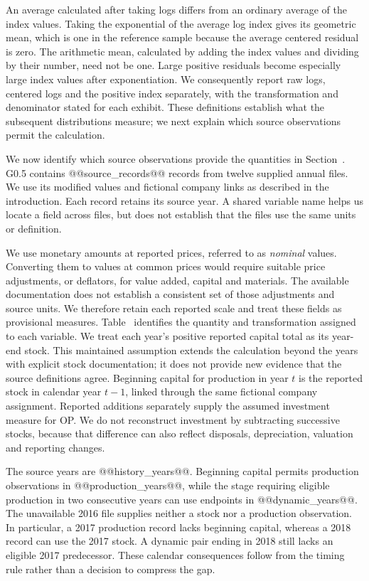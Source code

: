 An average calculated after taking logs differs from an ordinary average of the index values. Taking the exponential of the average log index gives its geometric mean, which is one in the reference sample because the average centered residual is zero. The arithmetic mean, calculated by adding the index values and dividing by their number, need not be one. Large positive residuals become especially large index values after exponentiation. We consequently report raw logs, centered logs and the positive index separately, with the transformation and denominator stated for each exhibit. These definitions establish what the subsequent distributions measure; we next explain which source observations permit the calculation.

We now identify which source observations provide the quantities in Section~. G0.5 contains @@source_records@@ records from twelve supplied annual files. We use its modified values and fictional company links as described in the introduction. Each record retains its source year. A shared variable name helps us locate a field across files, but does not establish that the files use the same units or definition.

We use monetary amounts at reported prices, referred to as \emph{nominal} values. Converting them to values at common prices would require suitable price adjustments, or deflators, for value added, capital and materials. The available documentation does not establish a consistent set of those adjustments and source units. We therefore retain each reported scale and treat these fields as provisional measures. Table~ identifies the quantity and transformation assigned to each variable.
We treat each year's positive reported capital total as its year-end stock. This maintained assumption extends the calculation beyond the years with explicit stock documentation; it does not provide new evidence that the source definitions agree. Beginning capital for production in year $t$ is the reported stock in calendar year $t-1$, linked through the same fictional company assignment. Reported additions separately supply the assumed investment measure for OP. We do not reconstruct investment by subtracting successive stocks, because that difference can also reflect disposals, depreciation, valuation and reporting changes.

The source years are @@history_years@@. Beginning capital permits production observations in @@production_years@@, while the stage requiring eligible production in two consecutive years can use endpoints in @@dynamic_years@@. The unavailable 2016 file supplies neither a stock nor a production observation. In particular, a 2017 production record lacks beginning capital, whereas a 2018 record can use the 2017 stock. A dynamic pair ending in 2018 still lacks an eligible 2017 predecessor. These calendar consequences follow from the timing rule rather than a decision to compress the gap.

